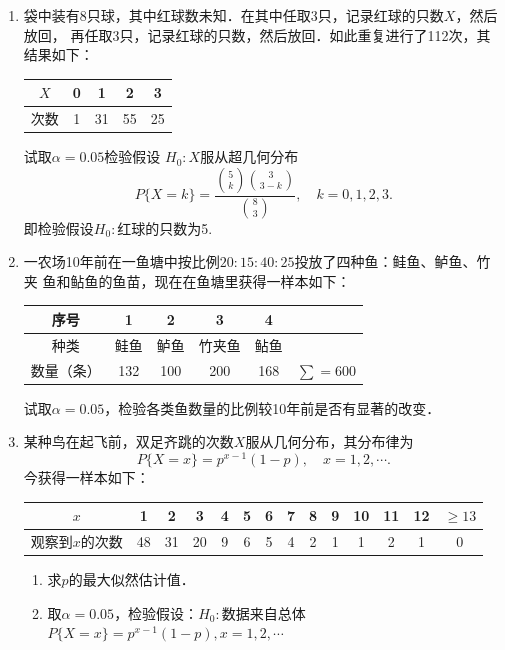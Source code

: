 \begin{enumerate}
    \item 袋中装有8只球，其中红球数未知．在其中任取3只，记录红球的只数$X$，然后放回，
    再任取3只，记录红球的只数，然后放回．如此重复进行了112次，其结果如下：
    \renewcommand{\arraystretch}{1.3}
    \begin{table}[H]\centering
        \begin{tabular}{c|cccc}
        $X$ & 0 & 1  & 2  & 3  \\ \hline
        次数  & 1 & 31 & 55 & 25
        \end{tabular}
        \end{table}
    \renewcommand{\arraystretch}{1.0}
    试取$\alpha=0.05$检验假设
    $H_0:X$服从超几何分布
    $$P\{X=k\}=\dfrac{\binom{5}{k} \binom{3}{3-k}} {\binom{8}{3}} ,\quad k=0,1,2,3.$$
    即检验假设$H_0:$红球的只数为5.






    \item 一农场10年前在一鱼塘中按比例$20:15:40:25$投放了四种鱼：鲑鱼、鲈鱼、竹夹
    鱼和鲇鱼的鱼苗，现在在鱼塘里获得一样本如下：
    \renewcommand{\arraystretch}{1.3}
    \begin{table}[H]\centering
        \begin{tabular}{c|ccccc}
        \hline
        序号    & 1   & 2   & 3   & 4   &            \\ \hline
        种类    & 鲑鱼  & 鲈鱼  & 竹夹鱼 & 鲇鱼  &            \\ \hline
        数量（条） & 132 & 100 & 200 & 168 & $\sum=600$ \\ \hline
        \end{tabular}
    \end{table}
    \renewcommand{\arraystretch}{1.0}
    试取$\alpha=0.05$，检验各类鱼数量的比例较10年前是否有显著的改变．




    \item 某种鸟在起飞前，双足齐跳的次数$X$服从几何分布，其分布律为
    $$P\{X=x\}=p^{x-1}(1-p),\quad x=1,2,\cdots.$$
    今获得一样本如下：
    \renewcommand{\arraystretch}{1.3}
    \begin{table}[H]\centering
        \begin{tabular}{c|ccccccccccccc}
        $x$       & 1  & 2  & 3  & 4 & 5 & 6 & 7 & 8 & 9 & 10 & 11 & 12 & $\geq 13$ \\ \hline
        观察到$x$的次数 & 48 & 31 & 20 & 9 & 6 & 5 & 4 & 2 & 1 & 1  & 2  & 1  & 0        
        \end{tabular}
    \end{table}
    \renewcommand{\arraystretch}{1.0}
    \begin{enumerate}
        \item 求$p$的最大似然估计值．
        \item 取$\alpha=0.05$，检验假设：$H_0:$数据来自总体$P\{X=x\}=p^{x-1}(1-p),x=1,2,\cdots$
    \end{enumerate}






\end{enumerate}
